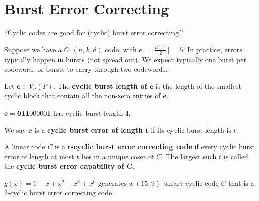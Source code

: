 \section{Burst Error Correcting}
``Cyclic codes are good for (cyclic) burst error correcting.''

Suppose we have a $ C:(n,k,d) $ code, with $ e=\lfloor \frac{d-1}{2} \rfloor=5 $.
In practice, errors typically happen in bursts (not spread out).
We expect typically one burst per codeword, or bursts to carry through
two codewords.

\begin{defbox}
    \begin{definition}
        Let $ \bm{e}\in V_n(F) $. The \textbf{cyclic burst length of $\bm{e}$}
        is the length of the smallest cyclic block that contain all the non-zero
        entries of $ \bm{e} $.
    \end{definition}
\end{defbox}

\begin{exbox}
    \begin{example}
        $ \bm{e}=\bm{011}00000\bm{1} $ has cyclic burst length $ 4 $.
    \end{example}
\end{exbox}

\begin{defbox}
    \begin{definition}
        We say $ \bm{e} $ is a \textbf{cyclic burst error of length $ \bm{t} $} if its cyclic
        burst length is $ t $.
    \end{definition}
\end{defbox}

\begin{defbox}
    \begin{definition}
        A linear code $ C $ is a \textbf{$ \bm{t} $-cyclic burst error correcting code}
        if every cyclic burst error of length at most $ t $ lies in a unique coset
        of $ C $. The largest such $ t $ is called the \textbf{cyclic burst error capability
        of $ \bm{C} $}.
    \end{definition}
\end{defbox}

\begin{exbox}
    \begin{example}
        $ g(x)=1+x+x^2+x^3+x^6 $ generates a $ (15,9) $-binary cyclic code $ C $
        that is a $ 3 $-cyclic burst error correcting code.
    \end{example}
\end{exbox}

